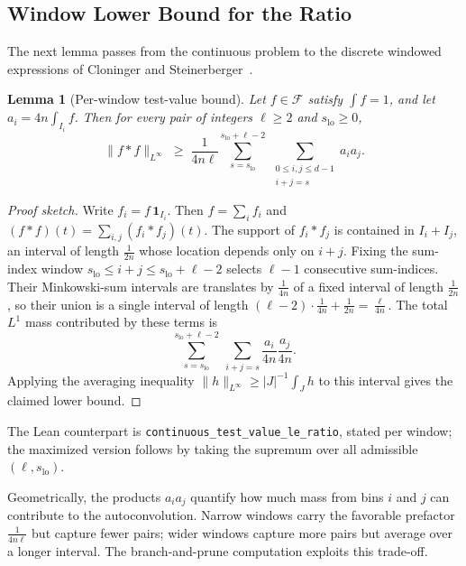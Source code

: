 \documentclass[11pt, letterpaper]{article}
\theoremstyle{paperplain}
\newtheorem{lemma}[theorem]{Lemma}
\theoremstyle{paperdef}
\begin{document}
\subsection{Window Lower Bound for the Ratio}

The next lemma passes from the continuous problem to the discrete
windowed expressions of Cloninger and
Steinerberger~\cite[Lemma~1]{CS17}.

\begin{lemma}[Per-window test-value bound]
\label{lem:bin-reduction}
Let $f\in\mathcal{F}$ satisfy $\int f=1$, and let
$a_i=4n\int_{I_i}f$.  Then for every pair of integers
$\ell\ge 2$ and $s_{\mathrm{lo}}\ge 0$,
\[
  \|f*f\|_{L^\infty}
  \;\ge\;
  \frac{1}{4n\ell}
  \sum_{s=s_{\mathrm{lo}}}^{s_{\mathrm{lo}}+\ell-2}
  \ \sum_{\substack{0\le i,j\le d-1\\ i+j=s}}
  a_i a_j.
\]
\end{lemma}

\begin{proof}[Proof sketch]
Write $f_i=f\,\mathbf{1}_{I_i}$.  Then
$f=\sum_i f_i$ and $(f*f)(t)=\sum_{i,j}(f_i*f_j)(t)$.  The support of
$f_i*f_j$ is contained in $I_i+I_j$, an interval of length
$\tfrac{1}{2n}$ whose location depends only on $i+j$.  Fixing the
sum-index window $s_{\mathrm{lo}}\le i+j\le s_{\mathrm{lo}}+\ell-2$
selects $\ell-1$ consecutive sum-indices.  Their Minkowski-sum
intervals are translates by $\tfrac{1}{4n}$ of a fixed interval of
length $\tfrac{1}{2n}$, so their union is a single interval of length
$(\ell-2)\cdot\tfrac{1}{4n}+\tfrac{1}{2n}=\tfrac{\ell}{4n}$.
The total $L^1$ mass contributed by these terms is
\[
  \sum_{s=s_{\mathrm{lo}}}^{s_{\mathrm{lo}}+\ell-2}
  \ \sum_{i+j=s}
  \frac{a_i}{4n}\frac{a_j}{4n}.
\]
Applying the averaging inequality
$\|h\|_{L^\infty}\ge |J|^{-1}\int_J h$ to this interval gives the
claimed lower bound.
\end{proof}

The Lean counterpart is
\texttt{continuous\_test\_value\_le\_ratio}, stated per window;
the maximized version follows by taking the supremum over all admissible
$(\ell,s_{\mathrm{lo}})$.

Geometrically, the products $a_i a_j$ quantify how much mass from
bins $i$ and $j$ can contribute to the autoconvolution.  Narrow windows
carry the favorable prefactor $\tfrac{1}{4n\ell}$ but capture fewer
pairs; wider windows capture more pairs but average over a longer
interval.  The branch-and-prune computation exploits this trade-off.


\end{document}
